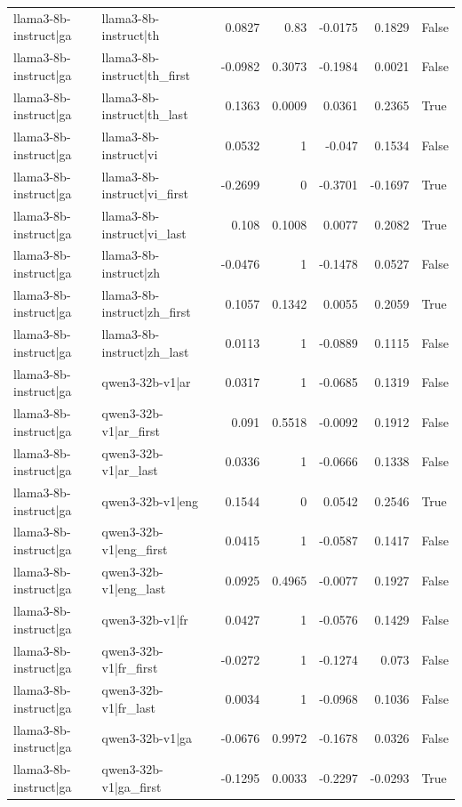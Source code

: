 \begin{table}
\begin{tabular}{l l r r r r l}
llama3-8b-instruct|ga & llama3-8b-instruct|th & 0.0827 & 0.83 & -0.0175 & 0.1829 & False \\
llama3-8b-instruct|ga & llama3-8b-instruct|th_first & -0.0982 & 0.3073 & -0.1984 & 0.0021 & False \\
llama3-8b-instruct|ga & llama3-8b-instruct|th_last & 0.1363 & 0.0009 & 0.0361 & 0.2365 & True \\
llama3-8b-instruct|ga & llama3-8b-instruct|vi & 0.0532 & 1 & -0.047 & 0.1534 & False \\
llama3-8b-instruct|ga & llama3-8b-instruct|vi_first & -0.2699 & 0 & -0.3701 & -0.1697 & True \\
llama3-8b-instruct|ga & llama3-8b-instruct|vi_last & 0.108 & 0.1008 & 0.0077 & 0.2082 & True \\
llama3-8b-instruct|ga & llama3-8b-instruct|zh & -0.0476 & 1 & -0.1478 & 0.0527 & False \\
llama3-8b-instruct|ga & llama3-8b-instruct|zh_first & 0.1057 & 0.1342 & 0.0055 & 0.2059 & True \\
llama3-8b-instruct|ga & llama3-8b-instruct|zh_last & 0.0113 & 1 & -0.0889 & 0.1115 & False \\
llama3-8b-instruct|ga & qwen3-32b-v1|ar & 0.0317 & 1 & -0.0685 & 0.1319 & False \\
llama3-8b-instruct|ga & qwen3-32b-v1|ar_first & 0.091 & 0.5518 & -0.0092 & 0.1912 & False \\
llama3-8b-instruct|ga & qwen3-32b-v1|ar_last & 0.0336 & 1 & -0.0666 & 0.1338 & False \\
llama3-8b-instruct|ga & qwen3-32b-v1|eng & 0.1544 & 0 & 0.0542 & 0.2546 & True \\
llama3-8b-instruct|ga & qwen3-32b-v1|eng_first & 0.0415 & 1 & -0.0587 & 0.1417 & False \\
llama3-8b-instruct|ga & qwen3-32b-v1|eng_last & 0.0925 & 0.4965 & -0.0077 & 0.1927 & False \\
llama3-8b-instruct|ga & qwen3-32b-v1|fr & 0.0427 & 1 & -0.0576 & 0.1429 & False \\
llama3-8b-instruct|ga & qwen3-32b-v1|fr_first & -0.0272 & 1 & -0.1274 & 0.073 & False \\
llama3-8b-instruct|ga & qwen3-32b-v1|fr_last & 0.0034 & 1 & -0.0968 & 0.1036 & False \\
llama3-8b-instruct|ga & qwen3-32b-v1|ga & -0.0676 & 0.9972 & -0.1678 & 0.0326 & False \\
llama3-8b-instruct|ga & qwen3-32b-v1|ga_first & -0.1295 & 0.0033 & -0.2297 & -0.0293 & True \\

\end{tabular}
\end{table}
